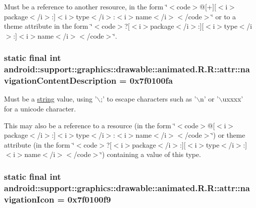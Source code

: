 Must be a reference to another resource, in the form \char`\"{}$<$code$>$@\mbox{[}+\mbox{]}\mbox{[}$<$i$>$package$<$/i$>$:\mbox{]}$<$i$>$type$<$/i$>$:$<$i$>$name$<$/i$>$$<$/code$>$\char`\"{} or to a theme attribute in the form \char`\"{}$<$code$>$?\mbox{[}$<$i$>$package$<$/i$>$:\mbox{]}\mbox{[}$<$i$>$type$<$/i$>$:\mbox{]}$<$i$>$name$<$/i$>$$<$/code$>$\char`\"{}. \hypertarget{classandroid_1_1support_1_1graphics_1_1drawable_1_1animated_1_1_r_1_1attr_48b8e32467ad0c9b5439a569b099c21d}{
\subsubsection[{navigationContentDescription}]{\setlength{\rightskip}{0pt plus 5cm}static final int android::support::graphics::drawable::animated.R.R::attr::navigationContentDescription = 0x7f0100fa}}
\label{classandroid_1_1support_1_1graphics_1_1drawable_1_1animated_1_1_r_1_1attr_48b8e32467ad0c9b5439a569b099c21d}


Must be a \hyperlink{classandroid_1_1support_1_1graphics_1_1drawable_1_1animated_1_1_r_1_1string}{string} value, using '$\backslash$;' to escape characters such as '$\backslash$n' or '$\backslash$uxxxx' for a unicode character. 

This may also be a reference to a resource (in the form \char`\"{}$<$code$>$@\mbox{[}$<$i$>$package$<$/i$>$:\mbox{]}$<$i$>$type$<$/i$>$:$<$i$>$name$<$/i$>$$<$/code$>$\char`\"{}) or theme attribute (in the form \char`\"{}$<$code$>$?\mbox{[}$<$i$>$package$<$/i$>$:\mbox{]}\mbox{[}$<$i$>$type$<$/i$>$:\mbox{]}$<$i$>$name$<$/i$>$$<$/code$>$\char`\"{}) containing a value of this type. \hypertarget{classandroid_1_1support_1_1graphics_1_1drawable_1_1animated_1_1_r_1_1attr_764d023fdd48a25236644f0e81b51c77}{
\subsubsection[{navigationIcon}]{\setlength{\rightskip}{0pt plus 5cm}static final int android::support::graphics::drawable::animated.R.R::attr::navigationIcon = 0x7f0100f9}}
\label{classandroid_1_1support_1_1graphics_1_1drawable_1_1animated_1_1_r_1_1attr_764d023fdd48a25236644f0e81b51c77}


